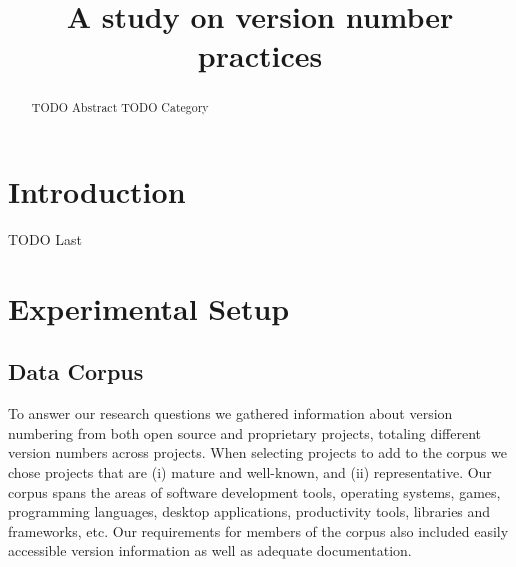 \documentclass[conference]{IEEEtran}
\begin{document}
\title{A study on version number practices}

\author{}


\maketitle
\begin{abstract}
 TODO Abstract
 TODO Category
 \end{abstract}


\IEEEpeerreviewmaketitle

\section{Introduction}
TODO Last



\section{Experimental Setup}

\subsection{Data Corpus}

\par To answer our research questions we gathered information about version numbering from both open source and proprietary projects, totaling \TotalVNs different version numbers across \TotalNumProjects projects. When selecting projects to add to the corpus we chose
projects that are (i) mature and well-known, and (ii) representative. Our corpus spans the areas of software development tools, operating systems, games, programming languages, desktop applications, productivity tools, libraries and frameworks, etc. 
Our requirements for members of the corpus also included easily accessible version information as well as adequate documentation.
\end{document}
